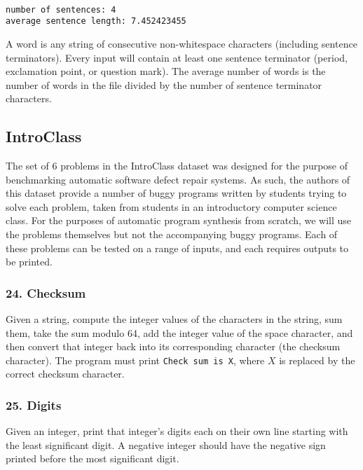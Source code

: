 \documentclass{sig-alternate}
\begin{document}
\texttt{ \\
number of sentences: 4 \\
average sentence length: 7.452423455 \\
} %

\noindent A word is any string of consecutive non-whitespace characters (including sentence terminators). Every input will contain at least one sentence terminator (period, exclamation point, or question mark). The average number of words is the number of words in the file divided by the number of sentence terminator characters.

\subsection{IntroClass}


The set of 6 problems in the IntroClass dataset \cite{ManyBugsAndIntroClass, Brun13TRgptest} was designed for the purpose of benchmarking automatic software defect repair systems. As such, the authors of this dataset provide a number of buggy programs written by students trying to solve each problem, taken from students in an introductory computer science class. For the purposes of automatic program synthesis from scratch, we will use the problems themselves but not the accompanying buggy programs. 
Each of these problems can be tested on a range of inputs, and each requires outputs to be printed.

\subsubsection*{24. Checksum}
Given a string, compute the integer values of the characters in the string, sum them, take the sum modulo 64, add the integer value of the space character, and then convert that integer back into its corresponding character (the checksum character). The program must print \texttt{Check sum is X}, where $X$ is replaced by the correct checksum character.

\subsubsection*{25. Digits}
Given an integer, print that integer's digits each on their own line starting with the least significant digit. A negative integer should have the negative sign printed before the most significant digit.
\end{document}
